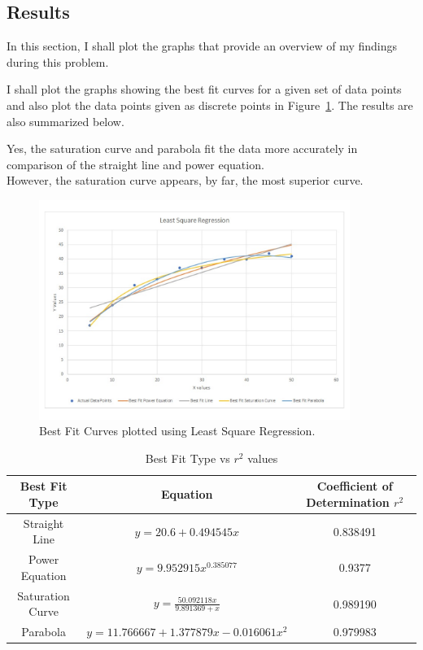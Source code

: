 \documentclass[titlepage, 11pt]{article}
\begin{document}
\subsection{Results}

In this section, I shall plot the graphs that provide an overview of my findings during this problem. 

I shall plot the graphs showing the best fit curves for a given set of data points and also plot the data points given as discrete points  in Figure~\ref{fig:q12}. The results are also summarized below. 

Yes, the saturation curve and parabola fit the data more accurately in comparison of the straight line and power equation. \\
However, the saturation curve appears, by far, the most superior curve. \\

\begin{figure}[!tbh]
  	\centering
  	\includegraphics[width=0.9\textwidth]{A5P2Graph.pdf} 
  	\caption{Best Fit Curves plotted using Least Square Regression.}
  	\label{fig:q12} 
\end{figure}

\begin{table}[!htb]
    \caption{Best Fit Type vs $r^2$ values}
    \centering
    \renewcommand{\arraystretch}{1.5}
    \begin{tabular}{ccc}
    \toprule
    \textbf{Best Fit Type}& \textbf{Equation}& \textbf{Coefficient of Determination $r^2$}   \\
    \midrule
         Straight Line & $y = 20.6 + 0.494545x $& 0.838491 \\
         Power Equation & $y = 9.952915 x ^{0.385077}$ & 0.9377 \\
         Saturation Curve & $y= \frac{50.092118x}{9.891369 + x} $ & 0.989190\\
         Parabola & $ y = 11.766667 + 1.377879x - 0.016061x^2$ & 0.979983 \\
    \bottomrule
    \end{tabular}
    \label{tab:tab2}
\end{table}
\end{document}
